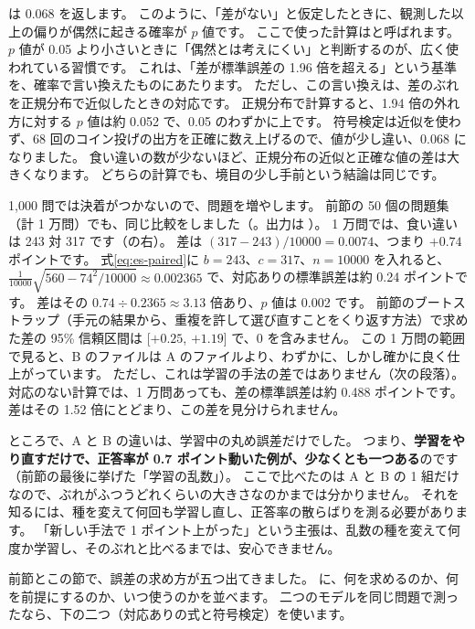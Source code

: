 
 は 0.068 を返します。
このように、「差がない」と仮定したときに、観測した以上の偏りが偶然に起きる確率が $p$ 値です。
ここで使った計算はと呼ばれます。
$p$ 値が 0.05 より小さいときに「偶然とは考えにくい」と判断するのが、広く使われている習慣です。
これは、「差が標準誤差の 1.96 倍を超える」という基準を、確率で言い換えたものにあたります。
ただし、この言い換えは、差のぶれを正規分布で近似したときの対応です。
正規分布で計算すると、1.94 倍の外れ方に対する $p$ 値は約 0.052 で、0.05 のわずかに上です。
符号検定は近似を使わず、68 回のコイン投げの出方を正確に数え上げるので、値が少し違い、0.068 になりました。
食い違いの数が少ないほど、正規分布の近似と正確な値の差は大きくなります。
どちらの計算でも、境目の少し手前という結論は同じです。

1,000 問では決着がつかないので、問題を増やします。
前節の 50 個の問題集（計 1 万問）でも、同じ比較をしました（。出力は ）。
1 万問では、食い違いは 243 対 317 です（の右）。
差は $(317-243)/10000=0.0074$、つまり $+0.74$ ポイントです。
式\eqref{eq:es-paired}に $b=243$、$c=317$、$n=10000$ を入れると、$\frac{1}{10000}\sqrt{560-74^2/10000}\approx0.002365$ で、対応ありの標準誤差は約 0.24 ポイントです。
差はその $0.74\div0.2365\approx3.13$ 倍あり、$p$ 値は 0.002 です。
前節のブートストラップ（手元の結果から、重複を許して選び直すことをくり返す方法）で求めた差の 95\% 信頼区間は [$+0.25$, $+1.19$] で、0 を含みません。
この 1 万問の範囲で見ると、B のファイルは A のファイルより、わずかに、しかし確かに良く仕上がっています。
ただし、これは学習の手法の差ではありません（次の段落）。
対応のない計算では、1 万問あっても、差の標準誤差は約 0.488 ポイントです。
差はその 1.52 倍にとどまり、この差を見分けられません。

ところで、A と B の違いは、学習中の丸め誤差だけでした。
つまり、\textbf{学習をやり直すだけで、正答率が 0.7 ポイント動いた例が、少なくとも一つある}のです（前節の最後に挙げた「学習の乱数」）。
ここで比べたのは A と B の 1 組だけなので、ぶれがふつうどれくらいの大きさなのかまでは分かりません。
それを知るには、種を変えて何回も学習し直し、正答率の散らばりを測る必要があります。
「新しい手法で 1 ポイント上がった」という主張は、乱数の種を変えて何度か学習し、そのぶれと比べるまでは、安心できません。

前節とこの節で、誤差の求め方が五つ出てきました。
に、何を求めるのか、何を前提にするのか、いつ使うのかを並べます。
二つのモデルを同じ問題で測ったなら、下の二つ（対応ありの式と符号検定）を使います。

